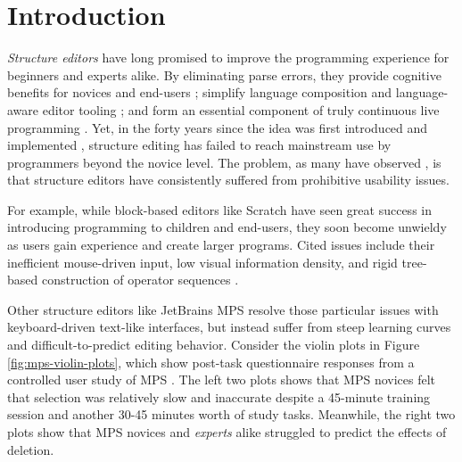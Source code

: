 \section{Introduction}\label{sec:intro}

\emph{Structure editors}
have long promised to improve the programming experience
for beginners and experts alike.
By eliminating parse errors,
they provide cognitive benefits for novices
  \cite{meta-analysis-blocks,blocks-text-high-school,coblox}
  and end-users
  \cite{weitnauer2016graspable,rousillon,BasHermans21};
  simplify language composition
  \cite{mbeddr}
  and language-aware editor tooling
  \cite{HazelnutSNAPL};
  and form an essential component of truly continuous live programming
  \cite{Hazelnut,HazelnutLive}.
Yet, in the forty years since the idea was first
introduced and implemented \cite{Cornell},
structure editing has failed to reach
mainstream use by programmers beyond the novice level.
The problem, as many have observed
\cite{user-modeling,fine-tuning-selection-semantics,
practical-lang-based-editing,lang-on-the-usefulness,
psg,Minor92,TowardUserFriendly,MillerPMV94},
is that structure editors have consistently suffered
from prohibitive usability issues.

For example, while
block-based editors like Scratch \cite{scratch}
have seen great success in introducing programming
to children and end-users, they soon become unwieldy
as users gain experience and create larger programs.
Cited issues include their inefficient mouse-driven
input, low visual information density, and rigid
tree-based construction of operator sequences
\cite{BlocksFingertips,cog-dim-blocks,blocks-and-beyond}.

Other structure editors like JetBrains MPS 
resolve those particular issues with
keyboard-driven text-like interfaces, but instead suffer
from steep learning curves and difficult-to-predict
editing behavior.
Consider the violin plots in Figure \ref{fig:mps-violin-plots},
which show post-task questionnaire responses from
a controlled user study of MPS \cite{ProjEfficiency}.
The left two plots shows that MPS novices felt that
selection was relatively slow and inaccurate despite
a 45-minute training session and another 30-45 minutes
worth of study tasks.
Meanwhile, the right two plots show that
MPS novices and \emph{experts} alike struggled to
predict the effects of deletion.


